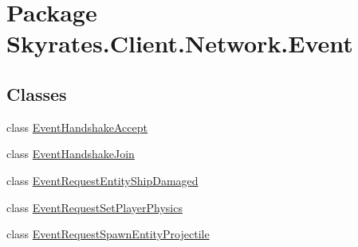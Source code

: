 \hypertarget{namespace_skyrates_1_1_client_1_1_network_1_1_event}{\section{Package Skyrates.\-Client.\-Network.\-Event}
\label{namespace_skyrates_1_1_client_1_1_network_1_1_event}
}
\subsection*{Classes}
\begin{DoxyCompactItemize}
\item 
class \hyperlink{class_skyrates_1_1_client_1_1_network_1_1_event_1_1_event_handshake_accept}{Event\-Handshake\-Accept}
\item 
class \hyperlink{class_skyrates_1_1_client_1_1_network_1_1_event_1_1_event_handshake_join}{Event\-Handshake\-Join}
\item 
class \hyperlink{class_skyrates_1_1_client_1_1_network_1_1_event_1_1_event_request_entity_ship_damaged}{Event\-Request\-Entity\-Ship\-Damaged}
\item 
class \hyperlink{class_skyrates_1_1_client_1_1_network_1_1_event_1_1_event_request_set_player_physics}{Event\-Request\-Set\-Player\-Physics}
\item 
class \hyperlink{class_skyrates_1_1_client_1_1_network_1_1_event_1_1_event_request_spawn_entity_projectile}{Event\-Request\-Spawn\-Entity\-Projectile}
\end{DoxyCompactItemize}
